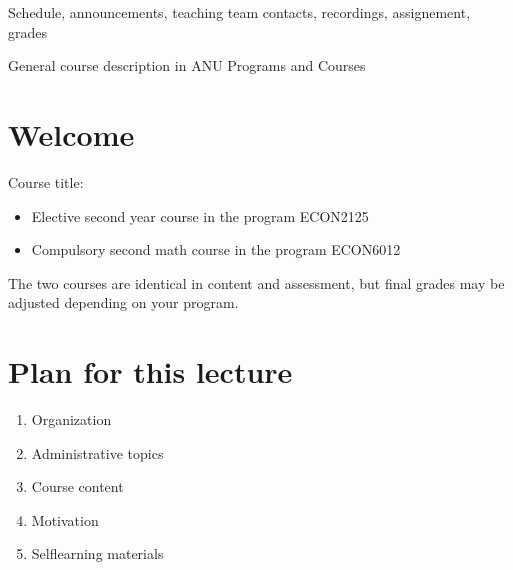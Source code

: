 \documentclass[letterpaper,10pt,english]{jupyterBook}
\begin{document}
\begin{DUlineblock}{0em}
\item[] 
\end{DUlineblock}

\sphinxAtStartPar
{}
Schedule, announcements, teaching team contacts, recordings, assignement, grades

\sphinxAtStartPar
{}
General course description in ANU Programs and Courses



\sphinxstepscope


\chapter{Welcome}
\label{\detokenize{01.introduction:welcome}}\label{\detokenize{01.introduction::doc}}
\sphinxAtStartPar
Course title: 
\begin{itemize}
\item {} 
\sphinxAtStartPar
Elective second year course in the  program ECON2125

\item {} 
\sphinxAtStartPar
Compulsory second math course in the  program ECON6012

\end{itemize}

\sphinxAtStartPar
The two courses are identical in content and assessment, but final grades may be adjusted depending on your program.


\chapter{Plan for this lecture}
\label{\detokenize{01.introduction:plan-for-this-lecture}}\begin{enumerate}
%
\item {} 
\sphinxAtStartPar
Organization

\item {} 
\sphinxAtStartPar
Administrative topics

\item {} 
\sphinxAtStartPar
Course content

\item {} 
\sphinxAtStartPar
Motivation

\item {} 
\sphinxAtStartPar
Self\sphinxhyphen{}learning materials

\end{enumerate}
\end{document}
